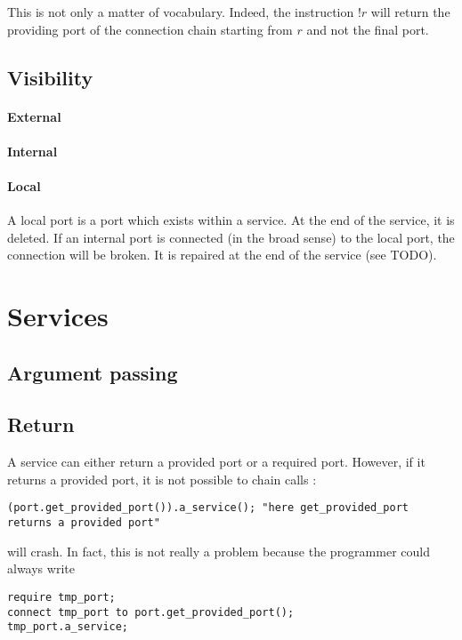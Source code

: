 This is not only a matter of vocabulary. Indeed, the instruction $!r$ will return the providing port of the connection chain starting from $r$ and not the final port. 

\subsection{Visibility}
\paragraph{External}

\paragraph{Internal}

\paragraph{Local}
\label{local_visibility}
A local port is a port which exists within a service. At the end of the service, it is deleted. If  an internal port is connected (in the broad sense) to the local port, the connection will be broken. It is repaired at the end of the service (see TODO).



\section{Services}
\subsection{Argument passing}

\subsection{Return}
\label{transp_port}
A service can either return a provided port or a required port. However, if it returns a provided port, it is not possible to chain calls : 
\begin{lstlisting}
(port.get_provided_port()).a_service(); "here get_provided_port returns a provided port"
\end{lstlisting}
will crash. In fact, this is not really a problem because the programmer could always write 
\begin{lstlisting}
require tmp_port;
connect tmp_port to port.get_provided_port();
tmp_port.a_service;
\end{lstlisting}

